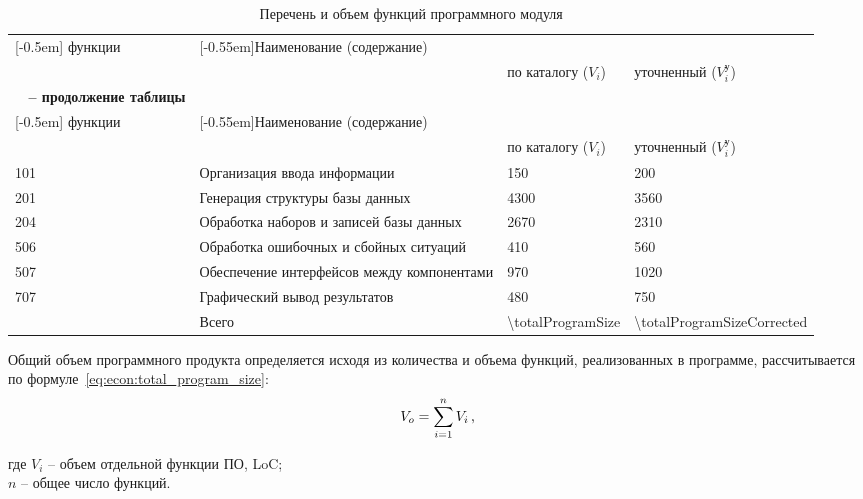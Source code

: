 \begin{longtable}{| >{\raggedright}m{}
                  | >{\centering}m{}
                  | >{\centering}m{}
                  | >{\centering\arraybackslash}m{}|}
\caption{Перечень и объем функций программного модуля}
\label{table:econ:volume_of_po} \\

\hline
       \multirow{2}{0.12\textwidth}[-0.5em]{\centering \No{} функции}
     & \multirow{2}{0.40\textwidth}[-0.55em]{\centering Наименование (содержание)}
     & \multicolumn{2}{c|}{\centering Объем функции, LoC} \tabularnewline
\cline{3-4} &
     & { по каталогу ($ V_{i} $) }
     & { уточненный ($ V_{i}^{\text{у}} $) } \tabularnewline
\endfirsthead

\multicolumn{3}{c}%
{{\bfseries \tablename\ \thetable{} -- продолжение таблицы}} \\
\hline
       \multirow{2}{0.12\textwidth}[-0.5em]{\centering \No{} функции}
     & \multirow{2}{0.40\textwidth}[-0.55em]{\centering Наименование (содержание)}
     & \multicolumn{2}{c|}{\centering Объем функции, LoC} \tabularnewline
\cline{3-4} &
     & { по каталогу ($ V_{i} $) }
     & { уточненный ($ V_{i}^{\text{у}} $) } \tabularnewline
\endhead

\hline
101 & Организация ввода информации & \num{150} & \num{200} \tabularnewline
\hline
201 & Генерация структуры базы данных & \num{4300} & \num{3560} \tabularnewline
\hline
204 & Обработка наборов и записей базы данных & \num{2670} & \num{2310} \tabularnewline
\hline
506 & Обработка ошибочных и сбойных ситуаций & \num{410} & \num{560} \tabularnewline
\hline
507 & Обеспечение интерфейсов между компонентами & \num{970} & \num{1020} \tabularnewline
\hline
707 & Графический вывод результатов & \num{480} & \num{750} \tabularnewline
\hline
& Всего & \num{\totalProgramSize} & \num{\totalProgramSizeCorrected} \tabularnewline
\hline
\end{longtable}

Общий объем программного продукта определяется исходя из количества и объема функций, реализованных в программе, рассчитывается по формуле~\ref{eq:econ:total_program_size}:
\begin{equation}
  \label{eq:econ:total_program_size}
  V_{o} = \sum_{i = 1}^{n} V_{i} \text{\,,}
\end{equation}
\begin{explanation}
где $V_{i}$ -- объем отдельной функции ПО, LoC; \\
    $n$ -- общее число функций.
\end{explanation}


